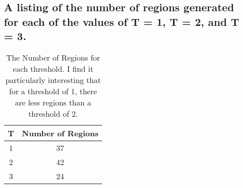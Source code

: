 \documentclass{article}
\begin{document}
\subsection{A listing of the number of regions generated for each of the values of T = 1, T = 2, and T = 3.}
\begin{table}[h!]
\begin{center}
\begin{tabular}{||c | c||} 
 \hline
 T & Number of Regions \\ [0.5ex] 
 \hline\hline
 1 & 37 \\
 \hline
 2 & 42 \\
 \hline
 3 & 24\\ 
 \hline\hline
\end{tabular}
\end{center}\label{table:1}
\caption{The Number of Regions for each threshold. I find it particularly interesting that for a threshold of 1, there are less regions than a threshold of 2.}
\end{table}
\newpage
\end{document}
